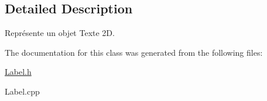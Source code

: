 \subsection{Detailed Description}
Représente un objet Texte 2\+D. 

The documentation for this class was generated from the following files\+:\begin{DoxyCompactItemize}
\item 
\hyperlink{Label_8h}{Label.\+h}\item 
Label.\+cpp\end{DoxyCompactItemize}
